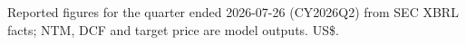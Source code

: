 \label{tab:key-data}
{\footnotesize Reported figures for the quarter ended 2026-07-26 (CY2026Q2) from SEC XBRL facts; NTM, DCF and target price are model outputs. US\$.\par}


